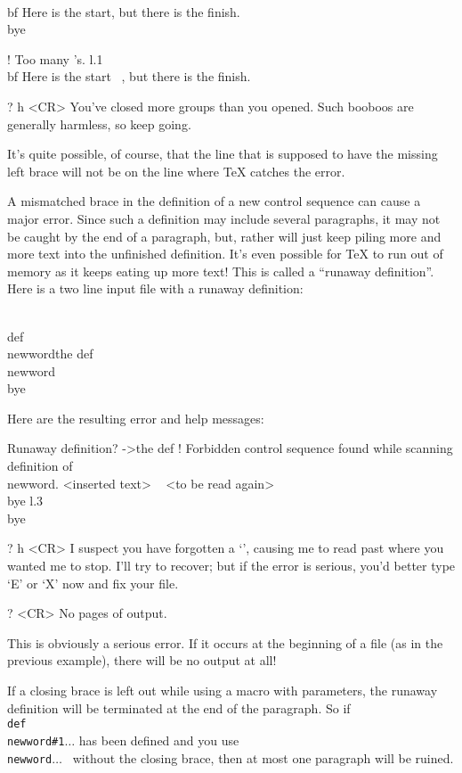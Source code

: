 \beginuser 
\\bf Here is the start\rb, but there is the finish. 
\\bye 
\enduser 
 
\beginuser \obeyspaces 
! Too many \rb's. 
l.1 \\bf Here is the start\rb 
\                          , but there is the finish. 
 
? h <CR> 
You've closed more groups than you opened. 
Such booboos are generally harmless, so keep going. 
\enduser 
 
It's quite possible, of course, that the line that is supposed to 
have the missing left brace will not be on the line where \TeX{} 
catches the error. 
 
A mismatched brace in the definition of a new control sequence 
can cause a major error.  Since such a definition may include 
several paragraphs, it may not be caught by the end of a 
paragraph, but, rather will just keep piling more and more text 
into the unfinished definition.  It's even possible for \TeX{} to 
run out of memory as it keeps eating up more text! This is called 
a ``runaway definition''. 
Here is a two line input file with a runaway definition: 
 
\vbox{ 
\beginuser 
\\def\\newword\lb the def 
\\newword 
\\bye 
\enduser 
} 
 
Here are the resulting error and help messages: 
 
\beginuser \obeyspaces 
Runaway definition? 
->the def 
! Forbidden control sequence found while scanning definition of \\newword. 
<inserted text> 
\                \rb 
<to be read again> 
\                   \\bye 
l.3 \\bye 
 
? h <CR> 
I suspect you have forgotten a `\rb', causing me 
to read past where you wanted me to stop. 
I'll try to recover; but if the error is serious, 
you'd better type `E' or `X' now and fix your file. 
 
? <CR> 
No pages of output. 
\enduser 
 
This is obviously a serious error.  If it occurs at the beginning 
of a file (as in the previous example), there will be no output 
at all! 
 
If a closing brace is left out while using a macro with 
parameters, the runaway definition will be terminated at the end 
of the paragraph. So if {\tt \\def\\newword\#1\lb$\ldots$\rb} has 
been defined and you use {\tt \\newword\lb$\dots$ } without the 
closing brace, then at most one paragraph will be ruined. 
 

